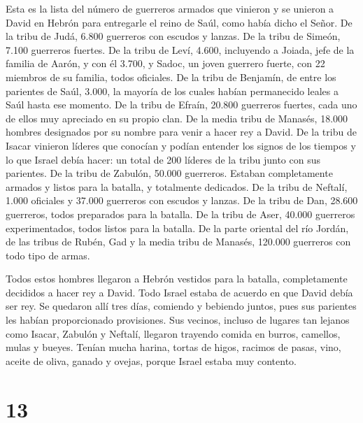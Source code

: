  Esta es la lista del número de guerreros armados que
vinieron y se unieron a David en Hebrón para entregarle el reino de
Saúl, como había dicho el Señor.  De la tribu de Judá,
6.800 guerreros con escudos y lanzas.  De la tribu de
Simeón, 7.100 guerreros fuertes.  De la tribu de Leví,
4.600,  incluyendo a Joiada, jefe de la familia de Aarón, y
con él 3.700,  y Sadoc, un joven guerrero fuerte, con 22
miembros de su familia, todos oficiales.  De la tribu de
Benjamín, de entre los parientes de Saúl, 3.000, la mayoría de los
cuales habían permanecido leales a Saúl hasta ese momento. 
De la tribu de Efraín, 20.800 guerreros fuertes, cada uno de ellos muy
apreciado en su propio clan.  De la media tribu de Manasés,
18.000 hombres designados por su nombre para venir a hacer rey a David.
 De la tribu de Isacar vinieron líderes que conocían y
podían entender los signos de los tiempos y lo que Israel debía hacer:
un total de 200 líderes de la tribu junto con sus parientes.
 De la tribu de Zabulón, 50.000 guerreros. Estaban
completamente armados y listos para la batalla, y totalmente dedicados.
 De la tribu de Neftalí, 1.000 oficiales y 37.000 guerreros
con escudos y lanzas.  De la tribu de Dan, 28.600
guerreros, todos preparados para la batalla.  De la tribu
de Aser, 40.000 guerreros experimentados, todos listos para la batalla.
 De la parte oriental del río Jordán, de las tribus de
Rubén, Gad y la media tribu de Manasés, 120.000 guerreros con todo tipo
de armas.

 Todos estos hombres llegaron a Hebrón vestidos para la
batalla, completamente decididos a hacer rey a David. Todo Israel estaba
de acuerdo en que David debía ser rey.  Se quedaron allí
tres días, comiendo y bebiendo juntos, pues sus parientes les habían
proporcionado provisiones.  Sus vecinos, incluso de lugares
tan lejanos como Isacar, Zabulón y Neftalí, llegaron trayendo comida en
burros, camellos, mulas y bueyes. Tenían mucha harina, tortas de higos,
racimos de pasas, vino, aceite de oliva, ganado y ovejas, porque Israel
estaba muy contento.

\hypertarget{section-12}{%
\section{13}\label{section-12}}

